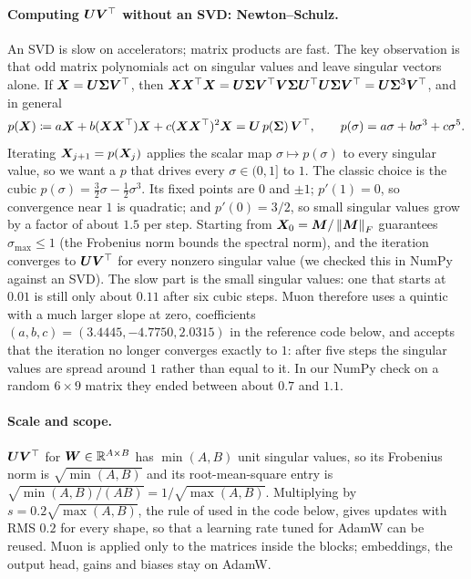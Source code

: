 \paragraph{Computing $\bm{U}\bm{V}^{\top}$ without an SVD: Newton--Schulz.} An SVD is slow on
accelerators; matrix products are fast. The key observation is that odd matrix polynomials
act on singular values and leave singular vectors alone. If $\bm{X} = \bm{U}\bm{\Sigma}\bm{V}^{\top}$, then
$\bm{X}\bm{X}^{\top}\bm{X} = \bm{U}\bm{\Sigma}\bm{V}^{\top}\bm{V}\bm{\Sigma}\bm{U}^{\top}\bm{U}\bm{\Sigma}\bm{V}^{\top} = \bm{U}\bm{\Sigma}^3\bm{V}^{\top}$, and in
general
\begin{equation}\label{eq:c01-ns-poly}
  p(\bm{X}) \coloneqq a\bm{X} + b(\bm{X}\bm{X}^{\top})\bm{X} + c(\bm{X}\bm{X}^{\top})^2\bm{X} = \bm{U}\,p(\bm{\Sigma})\,\bm{V}^{\top},
  \qquad p(\sigma) = a\sigma + b\sigma^3 + c\sigma^5 .
\end{equation}
Iterating $\bm{X}_{j+1} = p(\bm{X}_j)$ applies the scalar map $\sigma \mapsto p(\sigma)$ to every
singular value, so we want a $p$ that drives every $\sigma \in (0, 1]$ to $1$. The classic
choice \citep{c01-bjorck1971orthogonal,c01-higham2008functions} is the cubic
$p(\sigma) = \tfrac{3}{2}\sigma - \tfrac{1}{2}\sigma^3$. Its fixed points are $0$ and $\pm 1$;
$p'(1) = 0$, so convergence near $1$ is quadratic; and $p'(0) = 3/2$, so small singular
values grow by a factor of about $1.5$ per step. Starting from
$\bm{X}_0 = \bm{M}/\left\lVert \bm{M}\right\rVert_F$ guarantees $\sigma_{\max} \le 1$ (the Frobenius norm bounds the
spectral norm), and the iteration converges to $\bm{U}\bm{V}^{\top}$ for every nonzero singular value
(we checked this in NumPy against an SVD). The slow part is the small singular values: one
that starts at $0.01$ is still only about $0.11$ after six cubic steps. Muon therefore uses a
quintic with a much larger slope at zero, coefficients $(a, b, c) = (3.4445, -4.7750,
2.0315)$ in the reference code below, and accepts that the iteration no longer converges
exactly to $1$: after five steps the singular values are spread around $1$ rather than equal
to it. In our NumPy check on a random $6\times 9$ matrix they ended between about $0.7$ and
$1.1$.

\paragraph{Scale and scope.} $\bm{U}\bm{V}^{\top}$ for $\bm{W}\in\mathbb{R}^{A\times B}$ has $\min(A,B)$ unit
singular values, so its Frobenius norm is $\sqrt{\min(A,B)}$ and its root-mean-square entry
is $\sqrt{\min(A,B)/(AB)} = 1/\sqrt{\max(A,B)}$. Multiplying by $s = 0.2\sqrt{\max(A,B)}$, the
rule of \citet{c01-liu2025muonscalable} used in the code below, gives updates with RMS $0.2$
for every shape, so that a learning rate tuned for AdamW can be reused. Muon is applied only
to the matrices inside the blocks; embeddings, the output head, gains and biases stay on
AdamW.

